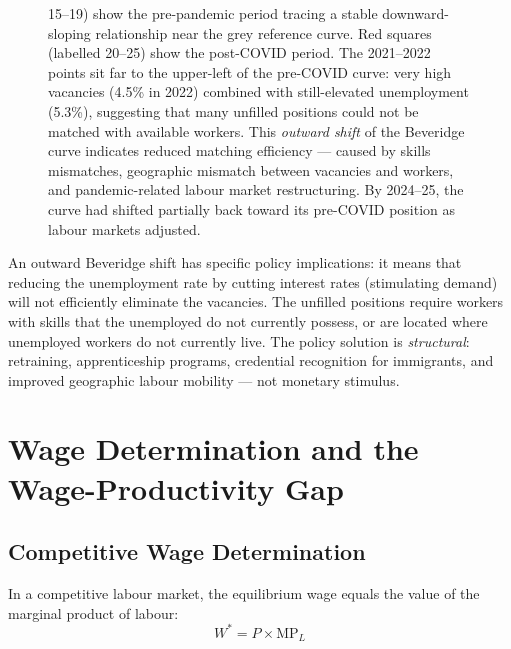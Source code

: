 \begin{figure}[H]
{15--19) show the pre-pandemic period tracing a stable downward-sloping
relationship near the grey reference curve. Red squares (labelled 20--25)
show the post-COVID period. The 2021--2022 points sit far to the
upper-left of the pre-COVID curve: very high vacancies (4.5\% in 2022)
combined with still-elevated unemployment (5.3\%), suggesting that many
unfilled positions could not be matched with available workers. This
\textit{outward shift} of the Beveridge curve indicates reduced matching
efficiency --- caused by skills mismatches, geographic mismatch between
vacancies and workers, and pandemic-related labour market restructuring.
By 2024--25, the curve had shifted partially back toward its pre-COVID
position as labour markets adjusted.}
\label{fig:beveridge}
\end{figure}

An outward Beveridge shift has specific policy implications: it means
that reducing the unemployment rate by cutting interest rates (stimulating
demand) will not efficiently eliminate the vacancies. The unfilled positions
require workers with skills that the unemployed do not currently possess,
or are located where unemployed workers do not currently live. The
policy solution is \textit{structural}: retraining, apprenticeship
programs, credential recognition for immigrants, and improved geographic
labour mobility --- not monetary stimulus.

\section{Wage Determination and the Wage-Productivity Gap}
\label{sec:wages}

\subsection{Competitive Wage Determination}

In a competitive labour market, the equilibrium wage equals the value of
the marginal product of labour:
\begin{equation}
  W^* = P \times \text{MP}_L
  \label{eq:vmp}
\end{equation}

